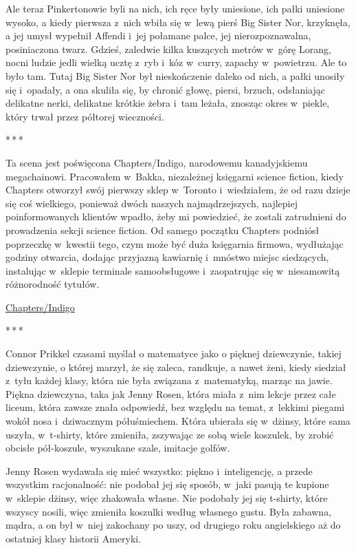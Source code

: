 \documentclass[oneside,polish,11pt,rmheadings]{mwbk}
\newcommand{\threeast}{\par\centerline{*\,*\,*}\medskip\par}
\begin{document}
Ale teraz Pinkertonowie byli na nich, ich ręce były uniesione, ich pałki uniesione wysoko, a kiedy pierwsza z~nich wbiła się w~lewą pierś Big Sister Nor, krzyknęła, a jej umysł wypełnił Affendi i~jej połamane palce, jej nierozpoznawalna, posiniaczona twarz. Gdzieś, zaledwie kilka kuszących metrów w~górę Lorang, nocni ludzie jedli wielką ucztę z~ryb i~kóz w~curry, zapachy w~powietrzu. Ale to było tam. Tutaj Big Sister Nor był nieskończenie daleko od nich, a pałki unosiły się i~opadały, a ona skuliła się, by chronić głowę, piersi, brzuch, odsłaniając delikatne nerki, delikatne krótkie żebra i~tam leżała, znosząc okres w~piekle, który trwał przez półtorej wieczności. 


\bigskip
\threeast


Ta scena jest poświęcona Chapters/Indigo, narodowemu kanadyjskiemu megachainowi. Pracowałem w~Bakka, niezależnej księgarni science fiction, kiedy Chapters otworzył swój pierwszy sklep w~Toronto i~wiedziałem, że od razu dzieje się coś wielkiego, ponieważ dwóch naszych najmądrzejszych, najlepiej poinformowanych klientów wpadło, żeby mi powiedzieć, że zostali zatrudnieni do prowadzenia sekcji science fiction. Od samego początku Chapters podniósł poprzeczkę w~kwestii tego, czym może być duża księgarnia firmowa, wydłużając godziny otwarcia, dodając przyjazną kawiarnię i~mnóstwo miejsc siedzących, instalując w~sklepie terminale samoobsługowe i~zaopatrując się w~niesamowitą różnorodność tytułów. 


\href{https://www.indigo.ca/en-ca/for-the-win-a-novel/9780765322166.html}{Chapters/Indigo} 

\bigskip
\threeast

Connor Prikkel czasami myślał o matematyce jako o pięknej dziewczynie, takiej dziewczynie, o której marzył, że się zaleca, randkuje, a nawet żeni, kiedy siedział z~tyłu każdej klasy, która nie była związana z~matematyką, marząc na jawie. Piękna dziewczyna, taka jak Jenny Rosen, która miała z~nim lekcje przez całe liceum, która zawsze znała odpowiedź, bez względu na temat, z~lekkimi piegami wokół nosa i~dziwacznym półuśmiechem. Która ubierała się w~dżinsy, które sama uszyła, w~t-shirty, które zmieniła, zszywając ze sobą wiele koszulek, by zrobić obcisłe pół-koszule, wyszukane szale, imitacje golfów. 


Jenny Rosen wydawała się mieć wszystko: piękno i~inteligencję, a przede wszystkim racjonalność: nie podobał jej się sposób, w~jaki pasują te kupione w~sklepie dżinsy, więc zhakowała własne. Nie podobały jej się t-shirty, które wszyscy nosili, więc zmieniła koszulki według własnego gustu. Była zabawna, mądra, a on był w~niej zakochany po uszy, od drugiego roku angielskiego aż do ostatniej klasy historii Ameryki. 
\end{document}

